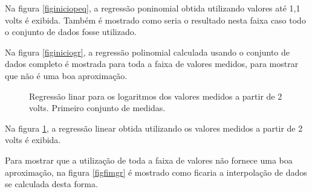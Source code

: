 \documentclass[brazilian,12pt,a4paper,final]{article}
\begin{document}
Na figura \ref{figiniciopeq}, a regressão poninomial obtida utilizando 
valores até 1,1 volts é exibida.
Também é 
mostrado como seria o resultado nesta faixa caso todo o conjunto de dados fosse utilizado.

Na figura \ref{figiniciogr}, a regressão polinomial calculada usando o
 conjunto de dados completo é mostrada para toda a faixa de valores medidos, para
mostrar que não é uma boa aproximação.

\begin{figure}[htbp!]
  \caption{Regressão linar para os logaritmos dos valores medidos a partir de 2 volts. Primeiro conjunto de medidas.}
  \label{figfimpeq}
  \centering
\end{figure}

Na figura \ref{figfimpeq}, a regressão linear obtida utilizando 
os valores medidos a partir de 2 volts é exibida.


Para mostrar que a utilização de toda a faixa de valores não fornece uma boa aproximação,
na figura \ref{figfimgr} é mostrado como ficaria a interpolação de dados se calculada desta forma.
\end{document}
